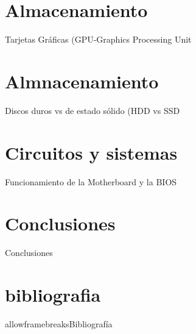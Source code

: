 \documentclass[aspectratio=169]{beamer}
\begin{document}
\section{Almacenamiento}
\begin{frame}{Tarjetas Gráficas (GPU-Graphics Processing Unit}
    
\end{frame}
\section{Almnacenamiento}
\begin{frame}{Discos duros vs de estado sólido (HDD vs SSD}
    
\end{frame}
\section{Circuitos y sistemas}
\begin{frame} {Funcionamiento de la Motherboard y la BIOS}
    
\end{frame}
\section{Conclusiones}
\begin{frame}{Conclusiones}
    
\end{frame}




\section{bibliografia}

\begin{frame}{allowframebreaks}{Bibliografía}
 \begin{thebibliography}


     
 \end{thebibliography}   
\end{frame}
\end{document}

